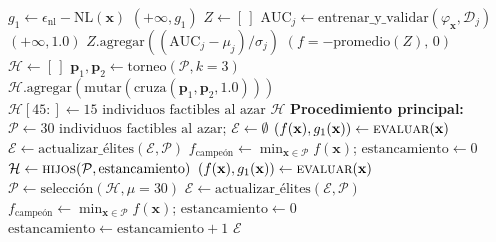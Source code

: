 \documentclass[10pt,twocolumn,letterpaper]{article}
\newcommand{\AUC}{\mathrm{AUC}}
\begin{document}
\begin{algorithm}[t]
\caption{Búsqueda Evolutiva ELGP-Activación}
\label{alg:elgp}
\scriptsize
\begin{algorithmic}[1]
 
  \State $g_1 \leftarrow \epsilon_{\mathrm{nl}} - \mathrm{NL}(\mathbf{x})$
   
    \State \Return $(+\infty, g_1)$ 
  \EndIf
  \State $Z \leftarrow [\,]$
   
    \State $\AUC_j \leftarrow \text{entrenar\_y\_validar}(\varphi_{\mathbf{x}}, \mathcal{D}_j)$
    \If{$\AUC_j$ no es finito}
      \State \Return $(+\infty, 1.0)$ 
    \EndIf
    \State $Z.\text{agregar}((\AUC_j - \mu_j) / \sigma_j)$
  \EndFor
  \State \Return $(f = -\mathrm{promedio}(Z),\, 0)$ 
\EndFunction
\Statex
{}
  \State $\mathcal{H} \leftarrow [\,]$
   
    \State $\mathbf{p}_1, \mathbf{p}_2 \leftarrow \text{torneo}(\mathcal{P}, k=3)$ 
    \State $\mathcal{H}.\text{agregar}(\text{mutar}(\text{cruza}(\mathbf{p}_1, \mathbf{p}_2, 1.0)))$
  \EndWhile
   
    \State $\mathcal{H}[45:] \leftarrow 15 \text{ individuos factibles al azar}$
  \EndIf
  \State \Return $\mathcal{H}$
\EndFunction
\Statex
\State \textbf{Procedimiento principal:}
\State $\mathcal{P} \leftarrow 30 \text{ individuos factibles al azar}$; $\mathcal{E} \leftarrow \emptyset$ 
  \State $(f(\mathbf{x}), g_1(\mathbf{x})) \leftarrow \Call{evaluar}{\mathbf{x}}$
\EndFor
\State $\mathcal{E} \leftarrow \text{actualizar\_élites}(\mathcal{E}, \mathcal{P})$
\State $f_{\mathrm{campeón}} \leftarrow \min_{\mathbf{x} \in \mathcal{P}} f(\mathbf{x})$; $\text{estancamiento} \leftarrow 0$
 
  \State $\mathcal{H} \leftarrow \Call{hijos}{\mathcal{P}, \text{estancamiento}}$
    \State $(f(\mathbf{x}), g_1(\mathbf{x})) \leftarrow \Call{evaluar}{\mathbf{x}}$
  \EndFor
  \State $\mathcal{P} \leftarrow \text{selección}(\mathcal{H}, \mu=30)$ 
  \State $\mathcal{E} \leftarrow \text{actualizar\_élites}(\mathcal{E}, \mathcal{P})$
    \State $f_{\mathrm{campeón}} \leftarrow \min_{\mathbf{x} \in \mathcal{P}} f(\mathbf{x})$; $\text{estancamiento} \leftarrow 0$
  \Else
    \State $\text{estancamiento} \leftarrow \text{estancamiento} + 1$
  \EndIf
\EndFor
\State \Return $\mathcal{E}$
\end{algorithmic}
\end{algorithm}
\end{document}
